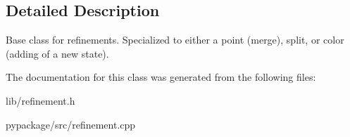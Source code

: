 \subsection{Detailed Description}
Base class for refinements. Specialized to either a point (merge), split, or color (adding of a new state). 

The documentation for this class was generated from the following files\+:\begin{DoxyCompactItemize}
\item 
lib/refinement.\+h\item 
pypackage/src/refinement.\+cpp\end{DoxyCompactItemize}
